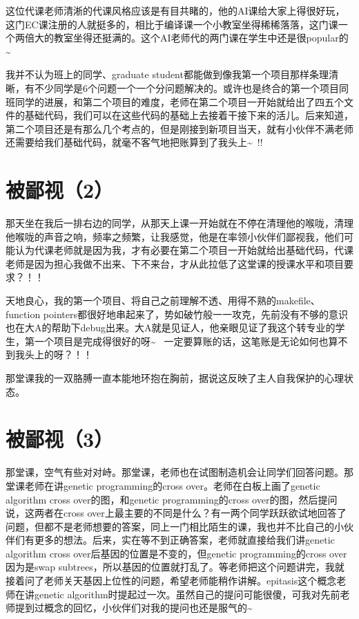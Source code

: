 \documentclass[12pt]{book}
\begin{document}
这位代课老师清淅的代课风格应该是有目共睹的，他的AI课给大家上得很好玩，这门EC课注册的人就挺多的，相比于编译课一个小教室坐得稀稀落落，这门课一个两倍大的教室坐得还挺满的。这个AI老师代的两门课在学生中还是很popular的\textasciitilde{}~

我并不认为班上的同学、graduate student都能做到像我第一个项目那样条理清晰，有不少同学是6个问题一个一个分问题解决的。或许也是终合的第一个项目同班同学的进展，和第二个项目的难度，老师在第二个项目一开始就给出了四五个文件的基础代码，我们可以在这些代码的基础上去接着干接下来的活儿。后来知道，第二个项目还是有那么几个考点的，但是刚接到新项目当天，就有小伙伴不满老师还需要给我们基础代码，就毫不客气地把账算到了我头上\textasciitilde{}~!!

\section{被鄙视（2）}
\label{sec-26-2}

那天坐在我后一排右边的同学，从那天上课一开始就在不停在清理他的喉咙，清理他喉咙的声音之响，频率之频繁，让我感觉，他是在率领小伙伴们鄙视我，他们可能认为代课老师就是因为我，才有必要在第二个项目一开始就给出基础代码，代课老师是因为担心我做不出来、下不来台，才从此拉低了这堂课的授课水平和项目要求？！！

天地良心，我的第一个项目、将自己之前理解不透、用得不熟的makefile、function pointers都很好地串起来了，势如破竹般一一攻克，先前没有不够的意识也在大A的帮助下debug出来。大A就是见证人，他亲眼见证了我这个转专业的学生，第一个项目是完成得很好的呀\textasciitilde{}~ 一定要算账的话，这笔账是无论如何也算不到我头上的呀？！！

那堂课我的一双胳膊一直本能地环抱在胸前，据说这反映了主人自我保护的心理状态。

\section{被鄙视（3）}
\label{sec-26-3}

那堂课，空气有些对对峙。那堂课，老师也在试图制造机会让同学们回答问题。那堂课老师在讲genetic programming的cross over。老师在白板上画了genetic algorithm cross over的图，和genetic programming的cross over的图，然后提问说，这两者在cross over上最主要的不同是什么？有一两个同学跃跃欲试地回答了问题，但都不是老师想要的答案，同上一门相比陌生的课，我也并不比自己的小伙伴们有更多的想法。后来，实在等不到正确答案，老师就直接给我们讲genetic algorithm cross over后基因的位置是不变的，但genetic programming的cross over因为是swap subtrees，所以基因的位置就打乱了。等老师把这个问题讲完，我就接着问了老师关天基因上位性的问题，希望老师能稍作讲解。epitasis这个概念老师在讲genetic algorithm时提起过一次。虽然自己的提问可能很傻，可我对先前老师提到过概念的回忆，小伙伴们对我的提问也还是服气的\textasciitilde{}~
\end{document}

